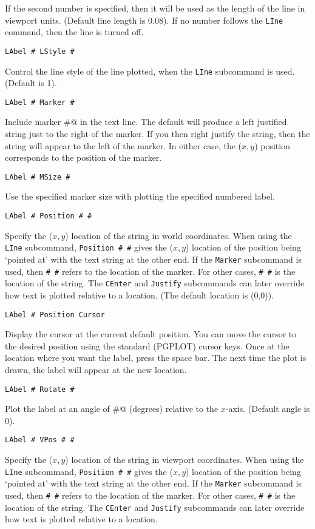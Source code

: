 If the second number is specified, then it will be used as the length
of the line in viewport units. (Default line length is 0.08). If no
number follows the {\tt LIne} command, then the line is turned off.
\medskip\begin{verbatim}
LAbel # LStyle #
\end{verbatim}
   Control the line style of the line plotted, when the {\tt LIne}
subcommand is used.  (Default is 1).
\medskip\begin{verbatim}
LAbel # Marker #
\end{verbatim}
   Include marker \verb@#@ in the text line.  The default will produce
a left justified string just to the right of the marker.  If you then
right justify the string, then the string will appear to the left of
the marker.  In either case, the ($x,y$) position corresponds to the
position of the marker.
\medskip\begin{verbatim}
LAbel # MSize #
\end{verbatim}
   Use the specified marker size with plotting the specified numbered label.
\medskip\begin{verbatim}
LAbel # Position # #
\end{verbatim}
   Specify the ($x,y$) location of the string in world coordinates.
When using the {\tt LIne} subcommand, {\tt Position~\#~\#} gives the ($x,y$)
location of the position being `pointed at' with the text string at
the other end.  If the {\tt Marker} subcommand is used, then {\tt \#~\#} refers
to the location of the marker.  For other cases, {\tt \#~\#} is the location
of the string.  The {\tt CEnter} and {\tt Justify} subcommands can later
override how text is plotted relative to a location.  (The default
location is (0,0)).

\medskip
\begin{verbatim}
LAbel # Position Cursor
\end{verbatim}
   Display the cursor at the current default position.  You can move
the cursor to the desired position using the standard (PGPLOT) cursor
keys.  Once at the location where you want the label, press the space
bar.  The next time the plot is drawn, the label will appear at the
new location.
\medskip\begin{verbatim}
LAbel # Rotate #
\end{verbatim}
   Plot the label at an angle of \verb@#@ (degrees) relative to the $x$-axis.
(Default angle is 0).
\medskip\begin{verbatim}
LAbel # VPos # #
\end{verbatim}
   Specify the ($x,y$) location of the string in viewport coordinates.
When using the {\tt LIne} subcommand, {\tt Position~\#~\#} gives the ($x,y$)
location of the position being `pointed at' with the text string at
the other end.  If the {\tt Marker} subcommand is used, then {\tt \#~\#} refers
to the location of the marker.  For other cases, {\tt \#~\#} is the location
of the string.  The {\tt CEnter} and {\tt Justify} subcommands can later
override how text is plotted relative to a location.

